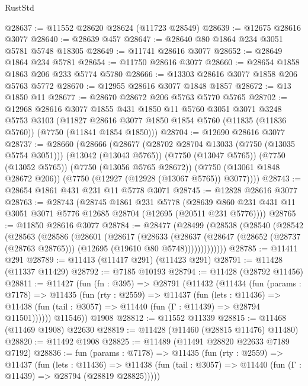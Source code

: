 \begin{lexlean}{RustStd}
\begin{coremodule}
@28637 := @11552 @28620 @28624 (@11723 @28549)
@28639 := @12675 @28616 @3077
@28640 := @28639 @457
@28647 := @28640 @80 @1864 @234 @3051 @5781 @5748 @18305
@28649 := @11741 @28616 @3077
@28652 := @28649 @1864 @234 @5781
@28654 := @11750 @28616 @3077
@28660 := @28654 @1858 @1863 @206 @233 @5774 @5780
@28666 := @13303 @28616 @3077 @1858 @206 @5763 @5772
@28670 := @12955 @28616 @3077 @1848 @1857
@28672 := @13 @1850 @11
@28677 := @28670 @28672 @206 @5763 @5770 @5765
@28702 := @12968
    @28616
    @3077
    @1855
    @431
    @1850
    @11
    @5760
    @3051
    @3071
    @3248
    @5753
    @3103
    (@11827 @28616 @3077 @1850 @1854 @5760 (@11835 (@11836 @5760)) (@7750 (@11841 @1854 @1850)))
@28704 := @12690 @28616 @3077
@28737 := @28660
    (@28666
      (@28677
        (@28702 @28704 @13033 (@7750 (@13035 @5754 @3051)))
        (@13042 (@13043 @5765))
        (@7750 (@13047 @5765))
        (@7750 (@13052 @5765))
        (@7750 (@13056 @5765 @28672))
        (@7750 (@13061 @1848 @28672 @206))
        (@7750 (@12927 (@12928 (@13067 @5765)) @3077))))
@28743 := @28654 @1861 @431 @231 @11 @5778 @3071
@28745 := @12828 @28616 @3077
@28763 := @28743
    (@28745
      @1861
      @231
      @5778
      (@28639 @860 @231 @431 @11 @3051 @3071 @5776 @12685 @28704 (@12695 (@20511 @231 @5776))))
@28765 := @11850 @28616 @3077
@28784 := @28477
    (@28499
      (@28538
        (@28540
          (@28542
            (@28563
              (@28586
                (@28601
                  (@28617
                    (@28633
                      (@28637
                        (@28647
                          (@28652 (@28737 (@28763 @28765)))
                          (@12695 (@19610 @80 @5748)))))))))))))
@28785 := @11411 @291
@28789 := @11413 (@11417 @291) (@11423 @291)
@28791 := @11428 (@11337 @11429)
@28792 := @7185 @10193
@28794 := @11428 (@28792 @11456)
@28811 := @11427
    (fun (fn : @395) =>
    @28791
      (@11432
        (@11434
          (fun (params : @7178) =>
          @11435
            (fun (rty : @2559) =>
            @11437
              (fun (lets : @11436) =>
              @11438 (fun (tail : @3057) => @11440 (fun (Γ : @11439) => @28794 @11501))))))
        @11546))
    @1908
@28812 := @11552 @11339
@28815 := @11468 (@11469 @1908) @22630
@28819 := @11428 (@11460 (@28815 @11476) @11480)
@28820 := @11492 @1908
@28825 := @11489 (@11491 @28820 @22633 @7189 @7192)
@28836 := fun (params : @7178) =>
  @11435
    (fun (rty : @2559) =>
    @11437
      (fun (lets : @11436) =>
      @11438 (fun (tail : @3057) => @11440 (fun (Γ : @11439) => @28794 (@28819 @28825)))))

\end{coremodule}
\end{lexlean}
